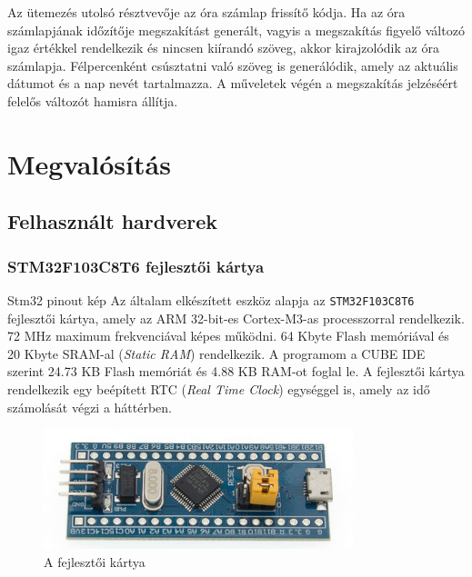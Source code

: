 \documentclass[a4paper, 12pt]{article}
\begin{document}
Az ütemezés utolsó résztvevője az óra számlap frissítő kódja. Ha az óra számlapjának időzítője megszakítást generált, vagyis a megszakítás figyelő változó igaz értékkel rendelkezik és nincsen kiírandó szöveg, akkor kirajzolódik az óra számlapja. Félpercenként csúsztatni való szöveg is generálódik, amely az aktuális dátumot és a nap nevét tartalmazza. A műveletek végén a megszakítás jelzéséért felelős változót hamisra állítja.

\section{Megvalósítás}
\subsection{Felhasznált hardverek}
\subsubsection{STM32F103C8T6 fejlesztői kártya}
Stm32 pinout kép
Az általam elkészített eszköz alapja az \texttt{STM32F103C8T6} fejlesztői kártya, amely az ARM 32-bit-es Cortex-M3-as processzorral rendelkezik. 72 MHz maximum frekvenciával képes működni. 64 Kbyte Flash memóriával és 20 Kbyte SRAM-al (\textit{Static RAM}) rendelkezik. A programom a CUBE IDE szerint 24.73 KB Flash memóriát és 4.88 KB RAM-ot foglal le.
A fejlesztői kártya rendelkezik egy beépített RTC (\textit{Real Time Clock}) egységgel is, amely az idő számolását végzi a háttérben.

\begin{figure}[ht]
	\centering
	\includegraphics[width = 9cm]{images/stm32.jpg}
	\caption{A fejlesztői kártya}
	\label{fig:mcu}
\end{figure}
\end{document}
